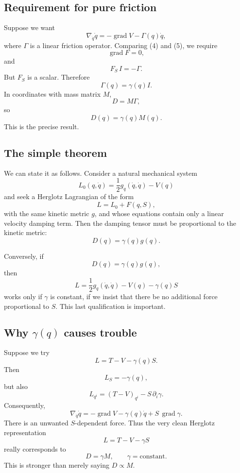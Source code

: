 \subsection{Requirement for pure friction}

Suppose we want
\begin{equation}
 \boxed{ \nabla_{\dot q}\dot q = -\operatorname{grad}V -\Gamma(q)\dot q, } \tag{5} 
\end{equation}
where \(\Gamma\) is a linear friction operator.
Comparing (4) and (5), we require
$$ \operatorname{grad}F=0, $$
and
\begin{equation}
 \boxed{ F_S\,I=-\Gamma. } \tag{6} 
\end{equation}
But \(F_S\) is a scalar.
Therefore
\begin{equation}
 \boxed{ \Gamma(q)=\gamma(q)I. } \tag{7} 
\end{equation}
In coordinates with mass matrix \(M\),$$ D=M\Gamma, $$
so 
\begin{equation}
 \boxed{ D(q)=\gamma(q)M(q). } \tag{8} 
\end{equation}
This is the precise result.

\subsection{The simple theorem}

We can state it as follows.
Consider a natural mechanical system
$$ L_0(q,\dot q) = \frac12g_q(\dot q,\dot q)-V(q) $$
and seek a Herglotz Lagrangian of the form
$$ L=L_0+F(q,S), $$
with the same kinetic metric \(g\), and whose equations contain only a linear velocity damping term.
Then the damping tensor must be proportional to the kinetic metric:
$$ \boxed{ D(q)=\gamma(q)g(q). } $$

Conversely, if
$$ D(q)=\gamma(q)g(q), $$
then
$$ \boxed{ L= \frac12g_q(\dot q,\dot q) -V(q) -\gamma(q)S } $$
works only if \(\gamma\) is constant, if we insist that there be no additional force proportional to \(S\).
This last qualification is important.

\subsection{ Why \(\gamma(q)\) causes trouble}

Suppose we try $$ L=T-V-\gamma(q)S. $$
Then $$ L_S=-\gamma(q), $$
but also
$$ L_{q^i} = (T-V)_{q^i} - S\,\partial_i\gamma. $$
Consequently,
\begin{equation}
 \boxed{ \nabla_{\dot q}\dot q = -\operatorname{grad}V -\gamma(q)\dot q + S\,\operatorname{grad}\gamma. } \tag{9} 
\end{equation}
There is an unwanted \(S\)-dependent force.
Thus the very clean Herglotz representation
$$ \boxed{ L=T-V-\gamma S } $$
really corresponds to
\begin{equation}
 \boxed{ D=\gamma M,\qquad \gamma=\text{constant}. } \tag{10} 
\end{equation}
This is stronger than merely saying \(D\propto M\).

